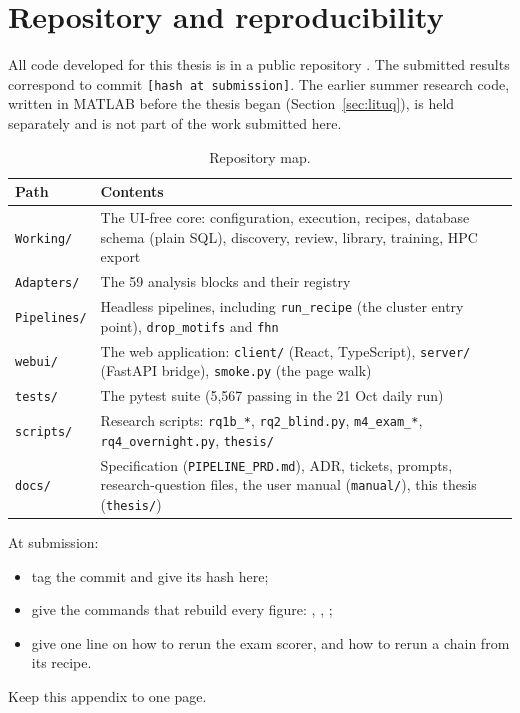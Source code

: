 \chapter{Repository and reproducibility}
\label{app:code}

All code developed for this thesis is in a public repository \cite{thesisrepo}. The submitted results correspond to commit \texttt{[hash at submission]}. The earlier summer research code, written in MATLAB before the thesis began (Section~\ref{sec:lituq}), is held separately \cite{summerrepo} and is not part of the work submitted here.

\begin{table}[htbp]
\caption[{Repository map.}]{Repository map.}
\label{tab:repomap}
\small
\begin{tabularx}{\textwidth}{p{4.2cm} X}
\toprule
\textbf{Path} & \textbf{Contents}\\
\midrule
\texttt{Working/} & The UI-free core: configuration, execution, recipes, database schema (plain SQL), discovery, review, library, training, HPC export\\
\texttt{Adapters/} & The 59 analysis blocks and their registry\\
\texttt{Pipelines/} & Headless pipelines, including \texttt{run\_recipe} (the cluster entry point), \texttt{drop\_motifs} and \texttt{fhn}\\
\texttt{webui/} & The web application: \texttt{client/} (React, TypeScript), \texttt{server/} (FastAPI bridge), \texttt{smoke.py} (the page walk)\\
\texttt{tests/} & The pytest suite (5,567 passing in the 21 Oct daily run)\\
\texttt{scripts/} & Research scripts: \texttt{rq1b\_*}, \texttt{rq2\_blind.py}, \texttt{m4\_exam\_*}, \texttt{rq4\_overnight.py}, \texttt{thesis/}\\
\texttt{docs/} & Specification (\texttt{PIPELINE\_PRD.md}), ADR, tickets, prompts, research-question files, the user manual (\texttt{manual/}), this thesis (\texttt{thesis/})\\
\bottomrule
\end{tabularx}
\end{table}

\begin{instructions}
At submission:
\begin{itemize}
  \item tag the commit and give its hash here;
  \item give the commands that rebuild every figure: , ,
        ;
  \item give one line on how to rerun the exam scorer, and how to rerun a chain from its recipe.
\end{itemize}
Keep this appendix to one page.
\end{instructions}
